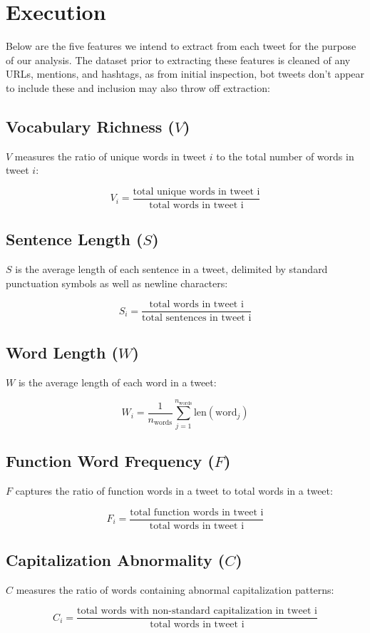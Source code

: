 \section*{Execution}
Below are the five features we intend to extract from each tweet for the purpose of our analysis. The dataset prior to extracting these features is cleaned of any URLs, mentions, and hashtags, as from initial inspection, bot tweets don't appear to include these and inclusion may also throw off extraction:

\subsection*{Vocabulary Richness ($ V $)}
$ V $ measures the ratio of unique words in tweet $ i $ to the total number of words in tweet $ i $: 

$$ V_i = \frac{\text{total unique words in tweet i}}{\text{total words in tweet i}} $$ 

\subsection*{Sentence Length ($ S $)}
$ S $ is the average length of each sentence in a tweet, delimited by standard punctuation symbols as well as newline characters:

$$ S_i = \frac{\text{total words in tweet i}}{\text{total sentences in tweet i}} $$

\subsection*{Word Length ($W$)}
$ W $ is the average length of each word in a tweet:

$$ W_i = \frac{1}{n_{\text{words}}} \sum_{j=1}^{n_{\text{words}}} \text{len}(\text{word}_j) $$

\subsection*{Function Word Frequency ($F$)}

$ F $ captures the ratio of function words in a tweet to total words in a tweet:

$$ F_i = \frac{\text{total function words in tweet i}}{\text{total words in tweet i}} $$

\subsection*{Capitalization Abnormality ($C$)}
$ C $ measures the ratio of words containing abnormal capitalization patterns:

$$ C_i = \frac{\text{total words with non-standard capitalization in tweet i}}{\text{total words in tweet i}} $$

